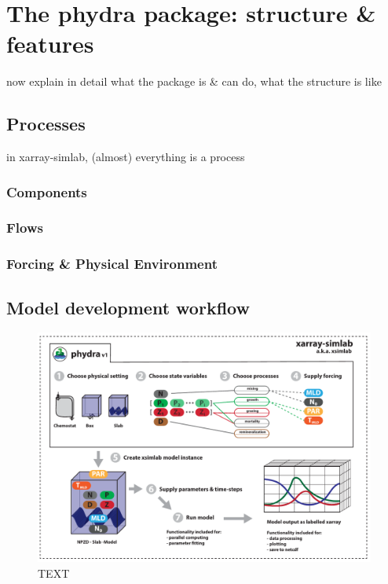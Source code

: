 \documentclass[journal abbreviation, manuscript]{copernicus}
\begin{document}
\section{The phydra package: structure \& features}

now explain in detail what the package is \& can do, what the structure is like

\subsection{Processes}
in xarray-simlab, (almost) everything is a process

\subsubsection{Components}
\subsubsection{Flows}
\subsubsection{Forcing & Physical Environment}

\subsection{Model development workflow}

%
\begin{figure}[t]
\includegraphics[width=12cm]{Figures/firstdraft_schematics/01__schematics_phydra.pdf}
\caption{TEXT}
\label{phydraschematics}
\end{figure}
\end{document}
